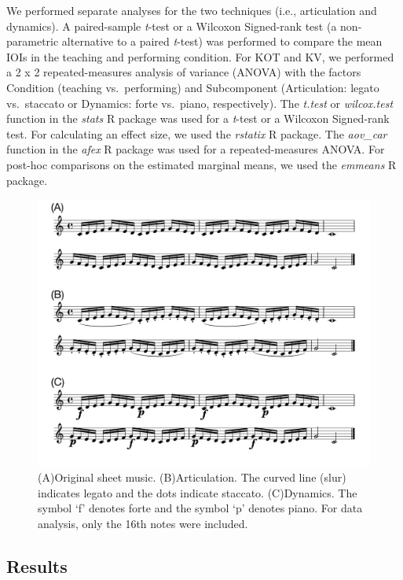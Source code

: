 \documentclass[
  man,floatsintext]{apa6}
\begin{document}
We performed separate analyses for the two techniques (i.e., articulation and dynamics). A paired-sample \emph{t}-test or a Wilcoxon Signed-rank test (a non-parametric alternative to a paired \emph{t}-test) was performed to compare the mean IOIs in the teaching and performing condition. For KOT and KV, we performed a 2 x 2 repeated-measures analysis of variance (ANOVA) with the factors Condition (teaching vs.~performing) and Subcomponent (Articulation: legato vs.~staccato or Dynamics: forte vs.~piano, respectively). The \emph{t.test} or \emph{wilcox.test} function in the \emph{stats} R package was used for a \emph{t}-test or a Wilcoxon Signed-rank test. For calculating an effect size, we used the \emph{rstatix} R package. The \emph{aov\_car} function in the \emph{afex} R package was used for a repeated-measures ANOVA. For post-hoc comparisons on the estimated marginal means, we used the \emph{emmeans} R package.

\begin{figure}
\includegraphics[width=1\linewidth]{manuscript_files/figure-latex/stim-1-1} \caption{\label{fig:stimuli}(A)Original sheet music. (B)Articulation. The curved line (slur) indicates legato and the dots indicate staccato. (C)Dynamics. The symbol `f' denotes forte and the symbol `p' denotes piano. For data analysis, only the 16th notes were included.}\label{fig:stim-1}
\end{figure}

\newpage

\hypertarget{results}{%
\subsection{Results}\label{results}}
\end{document}
